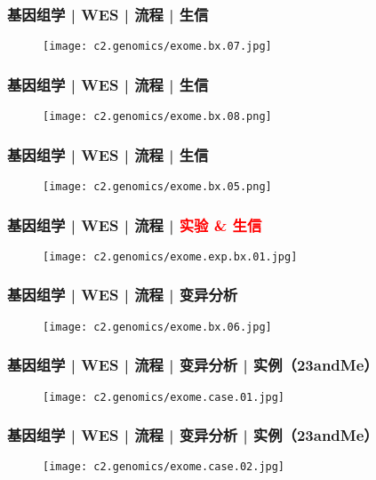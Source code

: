 \begin{frame}
  \frametitle{基因组学 | WES | 流程 | 生信}
  \begin{figure}
    \centering
    \texttt{[image: c2.genomics/exome.bx.07.jpg]}
  \end{figure}
\end{frame}

\begin{frame}
  \frametitle{基因组学 | WES | 流程 | 生信}
  \begin{figure}
    \centering
    \texttt{[image: c2.genomics/exome.bx.08.png]}
  \end{figure}
\end{frame}

\begin{frame}
  \frametitle{基因组学 | WES | 流程 | 生信}
  \begin{figure}
    \centering
    \texttt{[image: c2.genomics/exome.bx.05.png]}
  \end{figure}
\end{frame}

\begin{frame}
  \frametitle{基因组学 | WES | 流程 | \textcolor{red}{实验 \& 生信}}
  \begin{figure}
    \centering
    \texttt{[image: c2.genomics/exome.exp.bx.01.jpg]}
  \end{figure}
\end{frame}

\begin{frame}
  \frametitle{基因组学 | WES | 流程 | 变异分析}
  \begin{figure}
    \centering
    \texttt{[image: c2.genomics/exome.bx.06.jpg]}
  \end{figure}
\end{frame}

\begin{frame}
  \frametitle{基因组学 | WES | 流程 | 变异分析 | 实例（23andMe）}
  \begin{figure}
    \centering
    \texttt{[image: c2.genomics/exome.case.01.jpg]}
  \end{figure}
\end{frame}

\begin{frame}
  \frametitle{基因组学 | WES | 流程 | 变异分析 | 实例（23andMe）}
  \begin{figure}
    \centering
    \texttt{[image: c2.genomics/exome.case.02.jpg]}
  \end{figure}
\end{frame}

